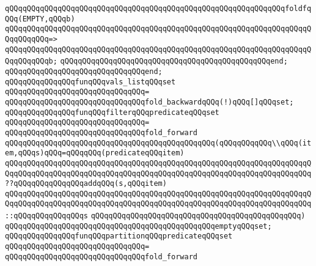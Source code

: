 \verb|qQQqqQQqqQQqqQQqqQQqqQQqqQQqqQQqqQQqqQQqqQQqqQQqqQQqqQQqqQQqqQQqfoldfqQQq(EMPTY,qQQqb)|\newline
\verb|qQQqqQQqqQQqqQQqqQQqqQQqqQQqqQQqqQQqqQQqqQQqqQQqqQQqqQQqqQQqqQQqqQQqqQQqqQQqqQQq=>|\newline
\verb|qQQqqQQqqQQqqQQqqQQqqQQqqQQqqQQqqQQqqQQqqQQqqQQqqQQqqQQqqQQqqQQqqQQqqQQqqQQqqQQqb;|\newline
\verb|qQQqqQQqqQQqqQQqqQQqqQQqqQQqqQQqqQQqqQQqqQQqqQQqend;|\newline
\verb|qQQqqQQqqQQqqQQqqQQqqQQqqQQqqQQqend;|\newline
\newline
\newline
\verb|qQQqqQQqqQQqqQQqfunqQQqvals_listqQQqset|\newline
\verb|qQQqqQQqqQQqqQQqqQQqqQQqqQQqqQQq=|\newline
\verb|qQQqqQQqqQQqqQQqqQQqqQQqqQQqqQQqfold_backwardqQQq(!)qQQq[]qQQqset;|\newline
\newline
\newline
\verb|qQQqqQQqqQQqqQQqfunqQQqfilterqQQqpredicateqQQqset|\newline
\verb|qQQqqQQqqQQqqQQqqQQqqQQqqQQqqQQq=|\newline
\verb|qQQqqQQqqQQqqQQqqQQqqQQqqQQqqQQqfold_forward|\newline
\verb|qQQqqQQqqQQqqQQqqQQqqQQqqQQqqQQqqQQqqQQqqQQqqQQq(qQQqqQQqqQQq\\qQQq(item,qQQqs)qQQq=qQQqqQQq(predicateqQQqitem)|\newline
\verb|qQQqqQQqqQQqqQQqqQQqqQQqqQQqqQQqqQQqqQQqqQQqqQQqqQQqqQQqqQQqqQQqqQQqqQQqqQQqqQQqqQQqqQQqqQQqqQQqqQQqqQQqqQQqqQQqqQQqqQQqqQQqqQQqqQQqqQQqqQQq??qQQqqQQqqQQqqQQqaddqQQq(s,qQQqitem)|\newline
\verb|qQQqqQQqqQQqqQQqqQQqqQQqqQQqqQQqqQQqqQQqqQQqqQQqqQQqqQQqqQQqqQQqqQQqqQQqqQQqqQQqqQQqqQQqqQQqqQQqqQQqqQQqqQQqqQQqqQQqqQQqqQQqqQQqqQQqqQQqqQQq::qQQqqQQqqQQqqQQqs|\newline
\verb|qQQqqQQqqQQqqQQqqQQqqQQqqQQqqQQqqQQqqQQqqQQqqQQq)|\newline
\verb|qQQqqQQqqQQqqQQqqQQqqQQqqQQqqQQqqQQqqQQqqQQqqQQqemptyqQQqset;|\newline
\newline
\newline
\verb|qQQqqQQqqQQqqQQqfunqQQqpartitionqQQqpredicateqQQqset|\newline
\verb|qQQqqQQqqQQqqQQqqQQqqQQqqQQqqQQq=|\newline
\verb|qQQqqQQqqQQqqQQqqQQqqQQqqQQqqQQqfold_forward|\newline
